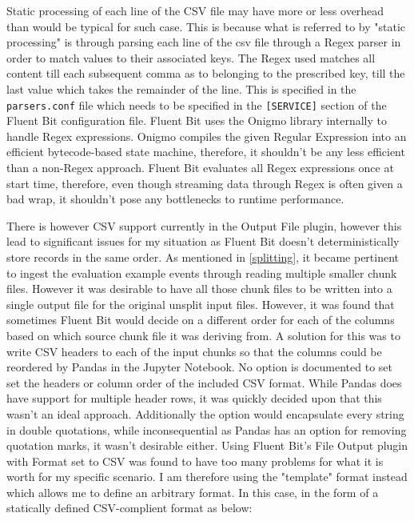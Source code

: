 Static processing of each line of the CSV file may have more or less overhead than would be typical for such case. This is because what is referred to by "static processing" is through parsing each line of the csv file through a Regex parser in order to match values to their associated keys. The Regex used matches all content till each subsequent comma as to belonging to the prescribed key, till the last value which takes the remainder of the line. This is specified in the \texttt{parsers.conf} file which needs to be specified in the \texttt{[SERVICE]} section of the Fluent Bit configuration file. Fluent Bit uses the Onigmo library internally to handle Regex expressions. Onigmo compiles the given Regular Expression into an efficient bytecode-based state machine\cite{Hess_2023}, therefore, it shouldn't be any less efficient than a non-Regex approach. Fluent Bit evaluates all Regex expressions once at start time, therefore, even though streaming data through Regex is often given a bad wrap, it shouldn't pose any bottlenecks to runtime performance.

There is however CSV support currently in the Output File plugin, however this lead to significant issues for my situation as Fluent Bit doesn't deterministically store records in the same order. As mentioned in \ref{splitting}, it became pertinent to ingest the evaluation example events through reading multiple smaller chunk files. However it was desirable to have all those chunk files to be written into a single output file for the original unsplit input files. However, it was found that sometimes Fluent Bit would decide on a different order for each of the columns based on which source chunk file it was deriving from. A solution for this was to write CSV headers to each of the input chunks so that the columns could be reordered by Pandas in the Jupyter Notebook. No option is documented to set set the headers or column order of the included CSV format. While Pandas does have support for multiple header rows, it was quickly decided upon that this wasn't an ideal approach. Additionally the option would encapsulate every string in double quotations, while inconsequential as Pandas has an option for removing quotation marks, it wasn't desirable either. Using Fluent Bit's File Output plugin with Format set to CSV was found to have too many problems for what it is worth for my specific scenario. I am therefore using the "template" format instead which allows me to define an arbitrary format. In this case, in the form of a statically defined CSV-complient format as below:

